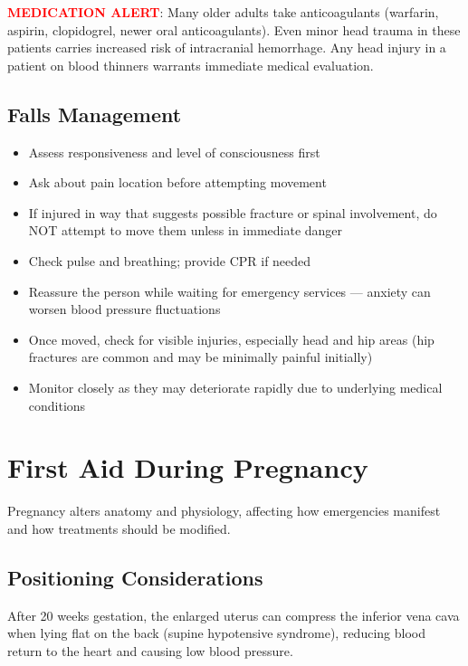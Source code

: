 \noindent\textbf{\textcolor{red}{MEDICATION ALERT}}: Many older adults take anticoagulants (warfarin, aspirin, clopidogrel, newer oral anticoagulants). Even minor head trauma in these patients carries increased risk of intracranial hemorrhage. Any head injury in a patient on blood thinners warrants immediate medical evaluation.

\subsection{Falls Management}

\begin{itemize}[leftmargin=*]
  \item Assess responsiveness and level of consciousness first
  \item Ask about pain location before attempting movement
  \item If injured in way that suggests possible fracture or spinal involvement, do NOT attempt to move them unless in immediate danger
  \item Check pulse and breathing; provide CPR if needed
  \item Reassure the person while waiting for emergency services — anxiety can worsen blood pressure fluctuations
  \item Once moved, check for visible injuries, especially head and hip areas (hip fractures are common and may be minimally painful initially)
  \item Monitor closely as they may deteriorate rapidly due to underlying medical conditions
\end{itemize}

\section{First Aid During Pregnancy}

Pregnancy alters anatomy and physiology, affecting how emergencies manifest and how treatments should be modified.

\subsection{Positioning Considerations}

After 20 weeks gestation, the enlarged uterus can compress the inferior vena cava when lying flat on the back (supine hypotensive syndrome), reducing blood return to the heart and causing low blood pressure.


